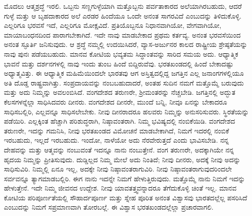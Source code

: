 ಮೊದಲು ಆತ್ಮಶ್ರದ್ಧೆ ಇರಲಿ. ಒಬ್ಬನು ಸಣ್ಣಗುಳ್ಳೆಯಾಗಿ ಮತ್ತೊಬ್ಬನು ಪರ್ವತಾಕಾರದ ಅಲೆಯಾಗಿರಬಹುದು, ಆದರೆ ಗುಳ್ಳೆ ಮತ್ತು ಆ ಬೃಹದಾಕಾರದ ಅಲೆ ಎರಡರ ಹಿಂದೆಯೂ ಒಂದೇ ಅನಂತ ಸಾಗರವಿದೆ ಎಂಬುದನ್ನು ತಿಳಿದುಕೊಳ್ಳಿ. ಎಲ್ಲರಿಗೂ ಭರವಸೆ ಇದೆ, ಎಲ್ಲರಿಗೂ ಮೋಕ್ಷವಿದೆ. ಪ್ರತಿಯೊಬ್ಬನೂ ನಿಧಾನವಾಗಿಯೋ, ವೇಗವಾಗಿಯೋ, ಮಾಯಾಬಂಧನದಿಂದ ಪಾರಾಗಬೇಕಾಗಿದೆ. ಇದೇ ನಾವು ಮಾಡಬೇಕಾದ ಪ್ರಥಮ ಕರ್ತವ್ಯ. ಅನಂತ ಭರವಸೆಯಿಂದ ಅನಂತ ಸ್ಫೂರ್ತಿ ಜನಿಸುವುದು. ಆ ಶ್ರದ್ಧೆ ನಮ್ಮಲ್ಲಿ ಉದಯಿಸಿದರೆ, ವ್ಯಾಸ-ಅರ್ಜುನರ ಕಾಲದ ರಾಷ್ಟ್ರೀಯ ಶ್ರೇಷ್ಠತೆಯನ್ನು ನಾವು ಪುನಃ ಪಡೆಯಬಹುದು. ಮಾನವ ಕೋಟಿಯ ಭವ್ಯತಮ ಸಿದ್ಧಾಂತವನ್ನು ಸಾರಿದ ಸಮಯ ಅದು. ಆಧ್ಯಾತ್ಮಿಕ ಭಾವನೆ ಮತ್ತು ದರ್ಶನಗಳಲ್ಲಿ ನಾವು ಇಂದು ತುಂಬ ಹಿಂದೆ ಬಿದ್ದಿರುವೆವು. ಭರತಖಂಡದಲ್ಲಿ ಹಿಂದೆ ಬೇಕಾದಷ್ಟು ಅಧ್ಯಾತ್ಮವಿತ್ತು. ಈ ಆಧ್ಯಾತ್ಮಿಕ ಮಹಿಮೆಯಿಂದಲೇ ಭಾರತವು ಆಗ ಅಸ್ತಿತ್ವದಲ್ಲಿದ್ದ ಜಗತ್ತಿನ ಎಲ್ಲ ಜನಾಂಗಗಳಲ್ಲಿಯೂ ಅತಿ ದೊಡ್ಡ ರಾಷ್ಟ್ರವಾಗಿತ್ತು. ಸಂಪ್ರದಾಯವನ್ನು ನಂಬಬಹುದಾದರೆ, ಅಂತಹ ಸುದಿನ ನಮಗೆ ಮತ್ತೊಮ್ಮೆ ಬರುವುದು ಮತ್ತು ಅದು ನಿಮ್ಮನ್ನು ಅವಲಂಬಿಸಿದೆ. ವಂಗದೇಶದ ತರುಣರೇ, ಶ‍್ರೀಮಂತರನ್ನು ನೆಚ್ಚಬೇಡಿ. ಜಗತ್ತಿನಲ್ಲಿ ಅದ್ಭುತ ಕೆಲಸಗಳನ್ನೆಲ್ಲಾ ಸಾಧಿಸಿದವರು ದೀನರು. ವಂಗದೇಶದ ದೀನರೇ, ಮುಂದೆ ಬನ್ನಿ, ನೀವೂ ಏನನ್ನು ಬೇಕಾದರೂ ಸಾಧಿಸಬಲ್ಲಿರಿ, ಎಲ್ಲವನ್ನೂ ಸಾಧಿಸಲೇಬೇಕು. ನೀವು ದೀನರಾದರೂ ಹಲವರು ನಿಮ್ಮನ್ನು ಅನುಸರಿಸುವರು. ಸ್ಥಿರತೆಯನ್ನು ಪಡೆಯಿರಿ. ಎಲ್ಲಕ್ಕಿಂತ ಹೆಚ್ಚಾಗಿ ಪರಿಶುದ್ಧರಾಗಿ, ನಿಷ್ಠಾವಂತರಾಗಿ. ನಿಮ್ಮ ಭವಿಷ್ಯದಲ್ಲಿ ನಂಬಿಕೆಯಿಡಿ. ವಂಗದೇಶದ ತರುಣರೇ, ಇದನ್ನು ಗಮನಿಸಿ, ನೀವು ಭರತಖಂಡದ ವಿಮೋಚನೆ ಮಾಡಬೇಕಾಗಿದೆ, ನಿಮಗೆ ಇದರಲ್ಲಿ ನಂಬಿಕೆ ಇರಬಹುದು, ಇಲ್ಲದೆ ಇರಬಹುದು. ಇಂದೋ, ನಾಳೆಯೋ ಅದು ನೆರವೇರುತ್ತದೆ ಎಂದು ಭಾವಿಸಬೇಡಿ. ನನ್ನ ದೇಹವನ್ನು ಮತ್ತು ಆತ್ಮವನ್ನು ನಂಬುವಂತೆ ಇದನ್ನೂ ನಾನು ನಂಬುತ್ತೇನೆ. ವಂಗ ತರುಣರೇ, ಅದಕ್ಕಾಗಿಯೇ ನನ್ನ ಹೃದಯ ನಿಮ್ಮನ್ನು ಪ್ರೀತಿಸುವುದು. ದುಡ್ಡಿಲ್ಲದ ನಿಮ್ಮ ಮೇಲೆ ಅದು ನಿಂತಿದೆ; ನೀವು ದೀನರು, ಅದಕ್ಕೆ ನೀವು ಅದನ್ನು ಸಾಧಿಸುವಿರಿ. ನಿಮ್ಮಲ್ಲಿ ಏನೂ ಇಲ್ಲ, ಅದಕ್ಕೇ ನೀವು ನಿಷ್ಠಾವಂತರಾಗುವಿರಿ. ನೀವು ನಿಷ್ಠಾವಂತರಾಗುವುದರಿಂದಲೇ ಸರ್ವವನ್ನೂ ತ್ಯಾಗಮಾಡಬಲ್ಲಿರಿ. ಈಗ ನಾನು ಇದನ್ನೇ ನಿಮಗೆ ಹೇಳುತ್ತಿರುವುದು. ಮತ್ತೊಮ್ಮೆ ನಾನು ನಿಮಗೆ ಇದನ್ನು ಹೇಳುತ್ತೇನೆ. ಇದೇ ನಿಮ್ಮ ಜೀವನದ ಉದ್ದೇಶ. ನೀವು ಯಾವ\break ತತ್ತ್ವವನ್ನಾದರೂ ತೆಗೆದುಕೊಳ್ಳಿ ಚಿಂತೆ ಇಲ್ಲ. ಮಾನವ ಕೋಟಿಯ ಪರಿಪೂರ್ಣತೆಯಲ್ಲಿ ಸೌಹಾರ್ದಪೂರ್ಣ ಮತ್ತು ಸ್ನೇಹ ಪೂರಿತ ಅನಂತ ವಿಶ್ವಾಸವು ಭಾರತದಲ್ಲೆಲ್ಲ ಪಸರಿಸಿದೆ ಎಂಬುದನ್ನು ನಿಮಗೆ ಸಪ್ರಮಾಣವಾಗಿ ತೋರಬಲ್ಲೆ. ಈ ವಿಶ್ವಾಸ ಭರತಖಂಡದಲ್ಲೆಲ್ಲಾ ಪ್ರಚಾರವಾಗಲಿ.

